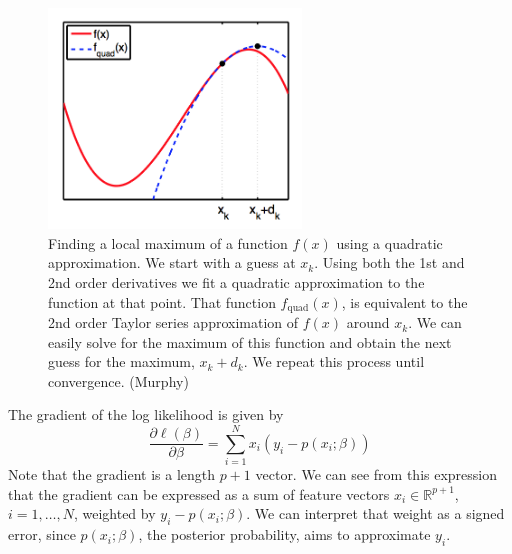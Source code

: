 \documentclass[a4paper]{article}
\begin{document}
\begin{figure}
\centering
\includegraphics[width=0.6\textwidth]{newton_noncvx.png}
\caption{Finding a local maximum of a function $f(x)$ using a quadratic approximation.  We start with a guess at $x_k$.  Using both the 1st and 2nd order derivatives we fit a quadratic approximation to the function at that point.  That function $f_{\text{quad}}(x)$, is equivalent to the 2nd order Taylor series approximation of $f(x)$ around $x_k$.  We can easily solve for the maximum of this function and obtain the next guess for the maximum, $x_k+d_k$. We repeat this process until convergence. (Murphy)}
\label{fig:newton2}
\end{figure}


The gradient of the log likelihood is given by
\begin{equation}
\frac{\partial \ell(\beta)}{\partial \beta} = \sum_{i=1}^N x_i (y_i - p(x_i;\beta))
\label{eqn:llgrad}
	\end{equation}
Note that the gradient is a length $p+1$ vector.  We can see from this expression that the gradient can be expressed as a sum of feature vectors $x_i\in\mathbb{R}^{p+1}$, $i=1,\ldots,N$, weighted by $y_i-p(x_i;\beta)$.  We can interpret that weight as a signed error, since $p(x_i;\beta)$, the posterior probability, aims to approximate $y_i$.
\end{document}
